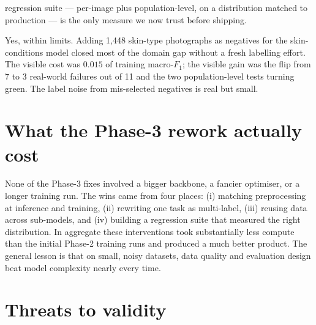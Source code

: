 \documentclass[11pt,a4paper,oneside]{report}
\begin{document}
\begin{description}
        regression suite --- per-image plus population-level, on
        a distribution matched to production --- is the only
        measure we now trust before shipping.
    \item[Cross-task data reuse.] Yes, within limits. Adding
        1{,}448 skin-type photographs as negatives for the
        skin-conditions model closed most of the domain gap
        without a fresh labelling effort. The visible cost was
        \(0.015\) of training macro-\(F_1\); the visible gain
        was the flip from 7 to 3 real-world failures out of 11
        and the two population-level tests turning green. The
        label noise from mis-selected negatives is real but
        small.
\end{description}

\section{What the Phase-3 rework actually cost}

None of the Phase-3 fixes involved a bigger backbone, a fancier
optimiser, or a longer training run. The wins came from four
places: (i) matching preprocessing at inference and training,
(ii) rewriting one task as multi-label, (iii) reusing data across
sub-models, and (iv) building a regression suite that measured
the right distribution. In aggregate these interventions took
substantially less compute than the initial Phase-2 training runs
and produced a much better product. The general lesson is that on
small, noisy datasets, data quality and evaluation design beat
model complexity nearly every time.

\section{Threats to validity}
\end{document}
